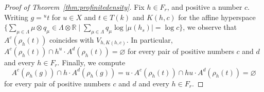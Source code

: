 \documentclass{amsart}
\theoremstyle{plain}
\theoremstyle{definition}
\theoremstyle{remark}
\providecommand{\abs}[1]{\lvert#1\rvert}
\begin{document}
\begin{proof}[Proof of Theorem~\ref{thm:profinitedensity}]
Fix $h \in F_{r}$, and positive a number $c$. Writing $g = \mbox{}^{u}t$ for $u
\in X$ and $t \in T(k)$ and $K(h, c)$ for the affine hyperspace $\{\sum_{\mu \in \Lambda} \mu \otimes q_{\mu} \in
\Lambda
\otimes
\mathbb{R} \mid \sum_{\mu \in \Lambda} q_{\mu} \log \abs{\mu(h_{s})} = \log c\}$,
we observe that $A^{c}(\rho_{h}(t))$ coincides with $V_{h, K(h, c)}$. In particular,
$A^{c}(\rho_{h}(t)) \cap h^{u} \cdot A^{d}(\rho_{h}(t)) = \varnothing$ for every pair of
positive numbers $c$ and $d$ and every $h \in F_{r}$. Finally, we compute
$$A^{c}(\rho_{h}(g)) \cap h \cdot
A^{d}(\rho_{h}(g)) = u \cdot A^{c}(\rho_{h}(t)) \cap hu \cdot A^{d}(\rho_{h}(t))
=\varnothing$$
for every pair of positive numbers $c$ and $d$ and every $h \in F_{r}$.
\end{proof}

\providecommand{\bysame}{\leavevmode\hbox to3em{\hrulefill}\thinspace}
\end{document}
